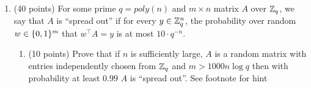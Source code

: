 \documentclass{article}
\begin{document}
\begin{enumerate}[,start=5]
\begin{mdbmarginx}{1ex}{0pt}{1ex}{0pt}%
\noindent{}\textbf{Proof}.  We can now conclude our proof. The proof follows immediately from the two lemmas above. 
If a language $L$ has zero-knowledge proof systems where the verifier is deterministic, then 
by Lemma 1 the language $L$ has a zero-knowledge proof system with perfect soundness. Then 
by Lemma 2, $L \in BPP$, which means it is decideable by a probabilistic polynomial time algorithm.%
\end{mdbmarginx}%

\item{}
(40 points) For some prime $q=poly(n)$ and $m\times n$ matrix $A$ over $\mathbb{Z}_q$, we say that $A$ is \textquotedblleft{}spread out\textquotedblright{} if for every $y\in\mathbb{Z}_q^n$, the probability over random $w\in\{0,1\}^m$ that  $w^\top A = y$ is at most $10\cdot q^{-n}$.%

\begin{enumerate}[noitemsep,topsep=\mdcompacttopsep,label=\alph*.]%

\item{}(10 points) Prove that if $n$ is sufficiently large, $A$ is a random matrix with entries independently chosen from $\mathbb{Z}_q$ and $m> 1000 n \log q$ then with probability at least $0.99$ $A$ is \textquotedblleft{}spread out\textquotedblright{}. See footnote for hint


\end{enumerate}
\end{enumerate}
\end{document}

